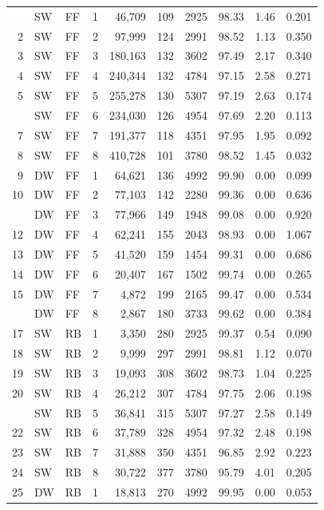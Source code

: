 \documentclass[
  11pt,
]{article}
\begin{document}
\begin{longtable}{rllrrrrrrr}
\endfoot
\bottomrule
\endlastfoot
1 & SW & FF & 1 & 46,709 & 109 & 2925 & 98.33 & 1.46 & 0.201\\
2 & SW & FF & 2 & 97,999 & 124 & 2991 & 98.52 & 1.13 & 0.350\\
3 & SW & FF & 3 & 180,163 & 132 & 3602 & 97.49 & 2.17 & 0.340\\
4 & SW & FF & 4 & 240,344 & 132 & 4784 & 97.15 & 2.58 & 0.271\\
5 & SW & FF & 5 & 255,278 & 130 & 5307 & 97.19 & 2.63 & 0.174\\
\addlinespace
6 & SW & FF & 6 & 234,030 & 126 & 4954 & 97.69 & 2.20 & 0.113\\
7 & SW & FF & 7 & 191,377 & 118 & 4351 & 97.95 & 1.95 & 0.092\\
8 & SW & FF & 8 & 410,728 & 101 & 3780 & 98.52 & 1.45 & 0.032\\
9 & DW & FF & 1 & 64,621 & 136 & 4992 & 99.90 & 0.00 & 0.099\\
10 & DW & FF & 2 & 77,103 & 142 & 2280 & 99.36 & 0.00 & 0.636\\
\addlinespace
11 & DW & FF & 3 & 77,966 & 149 & 1948 & 99.08 & 0.00 & 0.920\\
12 & DW & FF & 4 & 62,241 & 155 & 2043 & 98.93 & 0.00 & 1.067\\
13 & DW & FF & 5 & 41,520 & 159 & 1454 & 99.31 & 0.00 & 0.686\\
14 & DW & FF & 6 & 20,407 & 167 & 1502 & 99.74 & 0.00 & 0.265\\
15 & DW & FF & 7 & 4,872 & 199 & 2165 & 99.47 & 0.00 & 0.534\\
\addlinespace
16 & DW & FF & 8 & 2,867 & 180 & 3733 & 99.62 & 0.00 & 0.384\\
17 & SW & RB & 1 & 3,350 & 280 & 2925 & 99.37 & 0.54 & 0.090\\
18 & SW & RB & 2 & 9,999 & 297 & 2991 & 98.81 & 1.12 & 0.070\\
19 & SW & RB & 3 & 19,093 & 308 & 3602 & 98.73 & 1.04 & 0.225\\
20 & SW & RB & 4 & 26,212 & 307 & 4784 & 97.75 & 2.06 & 0.198\\
\addlinespace
21 & SW & RB & 5 & 36,841 & 315 & 5307 & 97.27 & 2.58 & 0.149\\
22 & SW & RB & 6 & 37,789 & 328 & 4954 & 97.32 & 2.48 & 0.198\\
23 & SW & RB & 7 & 31,888 & 350 & 4351 & 96.85 & 2.92 & 0.223\\
24 & SW & RB & 8 & 30,722 & 377 & 3780 & 95.79 & 4.01 & 0.205\\
25 & DW & RB & 1 & 18,813 & 270 & 4992 & 99.95 & 0.00 & 0.053\\

\end{longtable}
\end{document}
